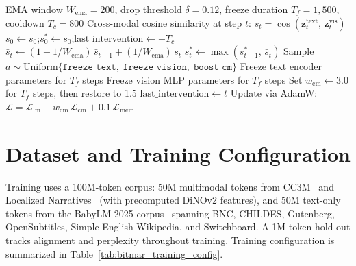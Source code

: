 \begin{algorithm}[htbp]
\small
\caption{Adaptive Training Controller (ATC) for modality collapse prevention.}
\label{alg:atc}
\begin{algorithmic}[1]
\Require EMA window $W_{\text{ema}}{=}200$, drop threshold $\delta{=}0.12$,
\Statex \hspace{\algorithmicindent} freeze duration $T_f{=}1{,}500$, cooldown $T_c{=}800$
\Require Cross-modal cosine similarity at step $t$:
\Statex \hspace{\algorithmicindent} $s_t = \cos(\mathbf{z}_t^{\text{text}},\, \mathbf{z}_t^{\text{vis}})$
\State $\bar{s}_0 \leftarrow s_0$;\enspace $s^*_0 \leftarrow s_0$;\enspace $\text{last\_intervention} \leftarrow -T_c$
    \State $\bar{s}_t \leftarrow (1 - 1/W_{\text{ema}})\,\bar{s}_{t-1} + (1/W_{\text{ema}})\,s_t$ 
    \State $s^*_t \leftarrow \max(s^*_{t-1},\, \bar{s}_t)$ 
        \State Sample $a \sim \mathrm{Uniform}\{\texttt{freeze\_text},\; \texttt{freeze\_vision},\; \texttt{boost\_cm}\}$
            \State Freeze text encoder parameters for $T_f$ steps
            \State Freeze vision MLP parameters for $T_f$ steps
        \Else
            \State Set $w_{\text{cm}} \leftarrow 3.0$ for $T_f$ steps, then restore to 1.5
        \EndIf
        \State $\text{last\_intervention} \leftarrow t$
    \EndIf
    \State Update via AdamW: $\mathcal{L} = \mathcal{L}_{\text{lm}} + w_{\text{cm}}\,\mathcal{L}_{\text{cm}} + 0.1\,\mathcal{L}_{\text{mem}}$
\EndFor
\end{algorithmic}
\end{algorithm}

\section{Dataset and Training Configuration}
\label{sec:bitmar_dataset}

Training uses a 100M-token corpus: 50M multimodal tokens from CC3M~\cite{sharma2018cc3m} and Localized Narratives~\cite{ponttuset2020localizednarratives} (with precomputed DiNOv2 features), and 50M text-only tokens from the BabyLM 2025 corpus~\cite{charpentier2025babylm} spanning BNC, CHILDES, Gutenberg, OpenSubtitles, Simple English Wikipedia, and Switchboard. A 1M-token hold-out tracks alignment and perplexity throughout training. Training configuration is summarized in Table~\ref{tab:bitmar_training_config}.

